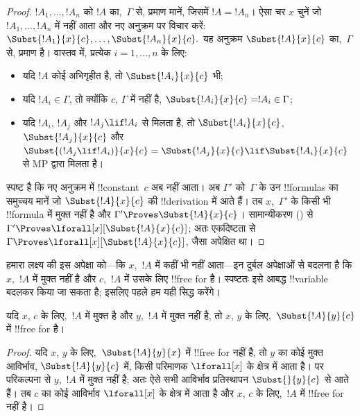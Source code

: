 \documentclass[../../../include/open-logic-section]{subfiles}
\begin{document}
\begin{proof} $!A_1,\ldots,!A_n$ को $!A$ का,~$\Gamma$ से, प्रमाण मानें,
जिसमें $!A=!A_n$। ऐसा चर $x$ चुनें जो $!A_1,\ldots,!A_n$ में नहीं आता और
नए अनुक्रम पर विचार करें:
$\Subst{!A_1}{x}{c},\ldots,\Subst{!A_n}{x}{c}.$ यह अनुक्रम
$\Subst{!A}{x}{c}$ का,~$\Gamma$ से, प्रमाण है। वास्तव में, प्रत्येक
$i=1,\ldots,n$ के
लिए: \begin{itemize} \item यदि $!A$ कोई अभिगृहीत है, तो
$\Subst{!A_i}{x}{c}$ भी; \item यदि $!A_i \in \Gamma$, तो क्योंकि $c$,
$\Gamma$ में नहीं है, $\Subst{!A_i}{x}{c} = !A_i \in \Gamma$; \item यदि
$!A_i$, $!A_j$ और $!A_j \lif !A_i$ से मिलता है, तो $\Subst{!A_i}{x}{c}$,
$\Subst{!A_j}{x}{c}$ और $\Subst{(!A_j \lif !A_i)}{x}{c}
= \Subst{!A_j}{x}{c} \lif \Subst{!A_i}{x}{c}$ से MP द्वारा मिलता है।
\end{itemize} स्पष्ट है कि नए अनुक्रम में !!{constant}~$c$ अब नहीं आता। अब
$\Gamma'$ को~$\Gamma$ के उन !!{formula}s का समुच्चय मानें जो
$\Subst{!A}{x}{c}$ की !!{derivation} में आते हैं। तब $x$,~$\Gamma'$ के किसी
भी !!{formula} में मुक्त नहीं है और $\Gamma' \Proves \Subst{!A}{x}{c}$।
सामान्यीकरण () से $\Gamma'
\Proves \lforall[x][\Subst{!A}{x}{c}]$; अतः एकदिष्टता से $\Gamma \Proves
\lforall[x][\Subst{!A}{x}{c}]$, जैसा अपेक्षित था।
\end{proof}

\begin{explain}
हमारा लक्ष्य  की इस अपेक्षा को—कि $x$,~$!A$ में कहीं भी
नहीं आता—इन दुर्बल अपेक्षाओं से बदलना है कि $x$,~$!A$ में मुक्त नहीं है और
$c$,~$!A$ में उसके लिए !!{free for} है। स्पष्टतः इसे आबद्ध !!{variable} बदलकर
किया जा सकता है; इसलिए पहले हम यही सिद्ध करेंगे।
\end{explain}

\begin{lem}
यदि $x$, $c$ के लिए,~$!A$ में मुक्त है और $y$,~$!A$ में मुक्त नहीं है, तो
$x$, $y$ के लिए,~$\Subst{!A}{y}{c}$ में !!{free for} है।
\end{lem}

\begin{proof} यदि $x$, $y$ के लिए,~$\Subst{!A}{y}{x}$ में !!{free for} नहीं
है, तो $y$ का कोई मुक्त आविर्भाव, $\Subst{!A}{y}{c}$ में, किसी परिमाणक
$\lforall[x]$ के क्षेत्र में आता है। पर परिकल्पना से $y$,~$!A$ में मुक्त
नहीं है; अतः ऐसे सभी आविर्भाव प्रतिस्थापन $\Subst{}{y}{c}$ से आते हैं। तब
$c$ का कोई आविर्भाव $\lforall[x]$ के क्षेत्र में आता है और $x$, $c$ के
लिए,~$!A$ में !!{free for} नहीं है।
\end{proof}
\end{document}
